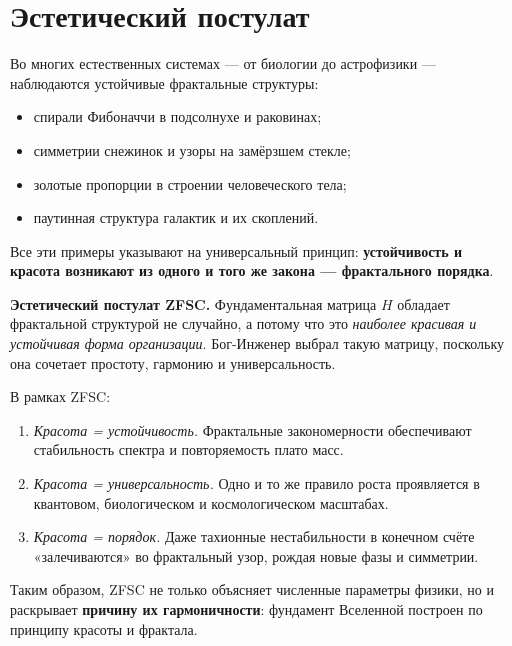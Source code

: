 \section{Эстетический постулат}

Во многих естественных системах --- от биологии до астрофизики --- наблюдаются устойчивые фрактальные структуры:
\begin{itemize}
  \item спирали Фибоначчи в подсолнухе и раковинах;
  \item симметрии снежинок и узоры на замёрзшем стекле;
  \item золотые пропорции в строении человеческого тела;
  \item паутинная структура галактик и их скоплений.
\end{itemize}

Все эти примеры указывают на универсальный принцип: \textbf{устойчивость и красота возникают из одного и того же закона --- фрактального порядка}.  

\textbf{Эстетический постулат ZFSC.}  
Фундаментальная матрица $H$ обладает фрактальной структурой не случайно, а потому что это \emph{наиболее красивая и устойчивая форма организации}.  
Бог-Инженер выбрал такую матрицу, поскольку она сочетает простоту, гармонию и универсальность.  

В рамках ZFSC:
\begin{enumerate}
  \item \emph{Красота = устойчивость.} Фрактальные закономерности обеспечивают стабильность спектра и повторяемость плато масс.
  \item \emph{Красота = универсальность.} Одно и то же правило роста проявляется в квантовом, биологическом и космологическом масштабах.
  \item \emph{Красота = порядок.} Даже тахионные нестабильности в конечном счёте «залечиваются» во фрактальный узор, рождая новые фазы и симметрии.
\end{enumerate}

Таким образом, ZFSC не только объясняет численные параметры физики, но и раскрывает \textbf{причину их гармоничности}: фундамент Вселенной построен по принципу красоты и фрактала.
